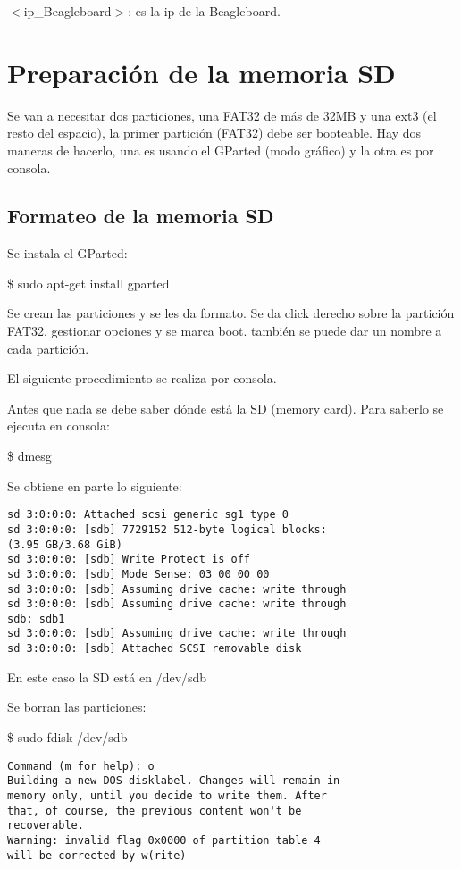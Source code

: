 \bigskip
$<$ip\_Beagleboard$>$: es la ip de la Beagleboard.


\section{Preparación de la memoria SD}\label{sd_prep}

Se van a necesitar dos particiones, una FAT32 de más de 32MB y una ext3 (el resto del espacio), la
primer partición (FAT32) debe ser booteable.
Hay dos maneras de hacerlo, una es usando el GParted (modo gráfico) y la otra es por consola.

\subsection{Formateo de la memoria SD}


Se instala el GParted:

\centerline{\$ sudo apt-get install gparted}

Se crean las particiones y se les da formato.
Se da click derecho sobre la partición FAT32, gestionar opciones y se marca boot. también se puede dar un nombre a cada partición.



El siguiente procedimiento se realiza por consola.

\bigskip
Antes que nada se debe saber dónde está la SD (memory card).
Para saberlo se ejecuta en consola: 

\centerline{\$ dmesg}

\bigskip
Se obtiene en parte lo siguiente: 
\begin{verbatim}
sd 3:0:0:0: Attached scsi generic sg1 type 0 
sd 3:0:0:0: [sdb] 7729152 512-byte logical blocks: 
(3.95 GB/3.68 GiB) 
sd 3:0:0:0: [sdb] Write Protect is off 
sd 3:0:0:0: [sdb] Mode Sense: 03 00 00 00 
sd 3:0:0:0: [sdb] Assuming drive cache: write through 
sd 3:0:0:0: [sdb] Assuming drive cache: write through 
sdb: sdb1 
sd 3:0:0:0: [sdb] Assuming drive cache: write through 
sd 3:0:0:0: [sdb] Attached SCSI removable disk 
\end{verbatim}

En este caso la SD está en /dev/sdb 

\bigskip
Se borran las particiones: 

\centerline{\$ sudo fdisk /dev/sdb}

\bigskip
\begin{verbatim}
Command (m for help): o 
Building a new DOS disklabel. Changes will remain in 
memory only, until you decide to write them. After 
that, of course, the previous content won't be 
recoverable. 
Warning: invalid flag 0x0000 of partition table 4 
will be corrected by w(rite) 
\end{verbatim}

